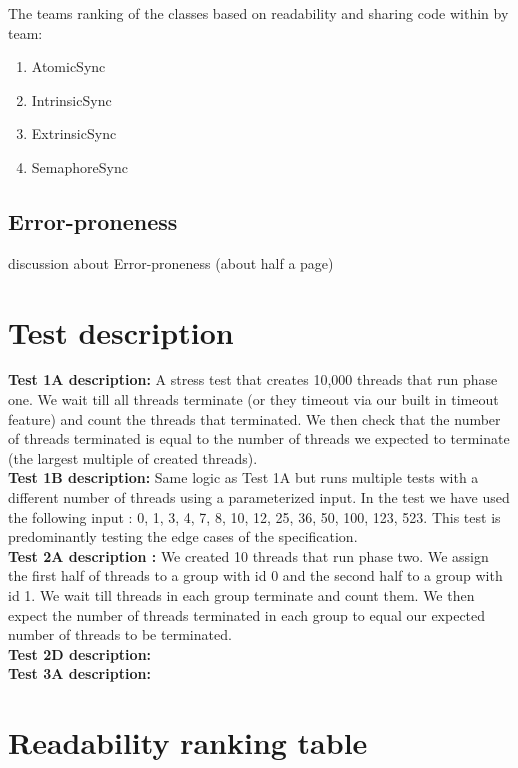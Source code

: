\documentclass[11pt]{article}
\begin{document}
The teams ranking of the classes based on readability and sharing code within by team: 

\begin{enumerate}
	\item AtomicSync
	\item IntrinsicSync
	\item ExtrinsicSync
	\item SemaphoreSync
\end{enumerate}

\pagebreak
\subsection{Error-proneness}
discussion about Error-proneness (about half a page)

\newpage
\appendix
\section{Test description}
\textbf{Test 1A description:} A stress test that creates 10,000 threads that run phase one. We wait till all threads terminate (or they timeout via our built in timeout feature) and count the threads that terminated. We then check that the number of threads terminated is equal to the number of threads we expected to terminate (the largest multiple of created threads).\\

\textbf{Test 1B description:} Same logic as Test 1A but runs multiple tests with a different number of threads using a parameterized input. In the test we have used the following input : {0, 1, 3, 4, 7, 8, 10, 12, 25, 36, 50, 100, 123, 523}. This test is predominantly testing the edge cases of the specification. \\

\textbf{Test 2A description :} We created 10 threads that run phase two. We assign the first half of threads to a group with id 0 and the second half to a group with id 1. We wait till threads in each group terminate and count them. We then expect the number of threads terminated in each group to equal our expected number of threads to be terminated. \\


\textbf{Test 2D description:}
\\

\textbf{Test 3A description:}
\\


\section{Readability ranking table}
\end{document}
